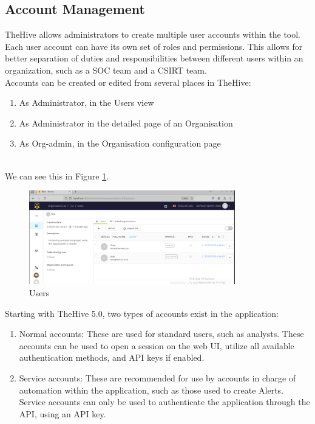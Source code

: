 \documentclass{article}
\begin{document}
\subsection{Account Management}
TheHive allows administrators to create multiple user accounts within the tool. Each user account can have its own set of roles and permissions. This allows for better separation of duties and responsibilities between different users within an organization, such as a SOC team and a CSIRT team.\\
Accounts can be created or edited from several places in TheHive:

\begin{enumerate}
  \item As Administrator, in the Users view
  \item As Administrator in the detailed page of an Organisation
  \item As Org-admin, in the Organisation configuration page

\end{enumerate}
 \\
We can see this in Figure \ref{fig:users}.
\begin{figure}[h!]
    \centering
    \includegraphics[width=0.8\textwidth]{img3.png}
    \caption{Users}
    \label{fig:users}
\end{figure}

Starting with TheHive 5.0, two types of accounts exist in the application:

\begin{enumerate}
  \item Normal accounts: These are used for standard users, such as analysts. These accounts can be used to open a session on the web UI, utilize all available authentication methods, and API keys if enabled.
  
  \item Service accounts: These are recommended for use by accounts in charge of automation within the application, such as those used to create Alerts. Service accounts can only be used to authenticate the application through the API, using an API key.
\end{enumerate}
\end{document}
